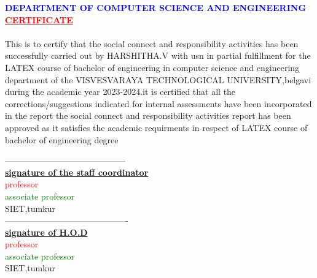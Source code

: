 \documentclass[a4paper,15pt]{article}
\begin{document}
\textcolor{blue}{\textbf{DEPARTMENT OF COMPUTER SCIENCE AND ENGINEERING}}\\
\vspace{5mm}
\centering
\vspace{5mm}
\textcolor{red}{\underline{\textbf{CERTIFICATE}}}\\
\paragraph{}
This is to certify that the social connect and responsibility activities has been successfully carried out by HARSHITHA.V with usn in partial fulfillment for the LATEX course of bachelor of engineering in computer science and engineering department of the VISVESVARAYA TECHNOLOGICAL UNIVERSITY,belgavi during the academic year 2023-2024.it is certified that all the corrections/suggestions indicated for internal assessments have been incorporated in the report the social connect and responsibility activities report has been approved as it satisfies the academic requirments in respect of LATEX course of bachelor of engineering degree
\begin{center}
\centering
------------------------------------------\\
\vspace{5mm}
\underline{\textbf{signature of the staff coordinator}}\\
\vspace{5mm}
\textcolor{red}{professor}\\
\textcolor{green}{associate professor}\\
SIET,tumkur\\
\vspace{10mm}
\centering
-------------------------------------------\\
\underline{\textbf{signature of H.O.D}}\\
\vspace{3mm}
\textcolor{red}{professor}\\
\textcolor{green}{associate professor}\\
SIET,tumkur\\
\end{center}
\end{document}

